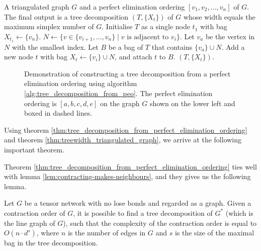 \begin{algorithm}[ht]
	\caption{Tree decomposition from a perfect elimination ordering}\label{alg:tree_decomposition_from_peo}
	\begin{algorithmic}[1]
		\Require A triangulated graph $G$ and a perfect elimination ordering $[v_1, v_2, \dots, v_n]$ of $G$.
		\Ensure The final output is a tree decomposition $(T, \{X_t\})$ of $G$ whose width equals the maximum simplex number of $G$.
		\State Initialise $T$ as a single node $t_1$ with bag $X_{t_1} \gets \{v_n\}$.
			\State $N \gets \{ v \in \{v_{i+1}, \dots, v_n\} \mid v \text{ is adjacent to } v_i \}$. 
			\State Let $v_a$ be the vertex in $N$ with the smallest index.
			\State Let $B$ be a bag of $T$ that contains $\{v_a\} \cup N$. 
			\State Add a new node $t$ with bag $X_t \gets \{v_i\} \cup N$, and attach $t$ to $B$.
		\EndFor
		\State \Return $(T, \{X_t\})$.
	\end{algorithmic}
\end{algorithm}

\begin{figure}[ht]
	\centering
	\resizebox{0.9\textwidth}{!}{
		
	}
	\caption{Demonstration of constructing a tree decomposition from a perfect elimination ordering using algorithm \ref{alg:tree_decomposition_from_peo}. The perfect elimination ordering is $[a,b,c,d,e]$ on the graph $G$ shown on the lower left and boxed in dashed lines.} 
	\label{fig:tree_decomposition_from_perfect_elimination_ordering}
\end{figure}

Using theorem \ref{thm:tree_decomposition_from_perfect_elimination_ordering} and theorem \ref{thm:treewidth_triangulated_graph}, we arrive at the following important theorem.

Theorem \ref{thm:tree_decomposition_from_perfect_elimination_ordering} ties well with lemma \ref{lem:contracting-makes-neighbours}, and they gives us the following lemma.

\begin{lemma}\label{lem:contraction_order_tree_decomposition}
	Let $G$ be a tensor network with no lose bonds and regarded as a graph. 
	Given a contraction order of $G$, it is possible to find a tree decomposition of $G^*$ (which is the line graph of $G$), such that the complexity of the contraction order is equal to $O(n \cdot d^{s})$, where $n$ is the number of edges in $G$ and $s$ is the size of the maximal bag in the tree decomposition.
\end{lemma}

